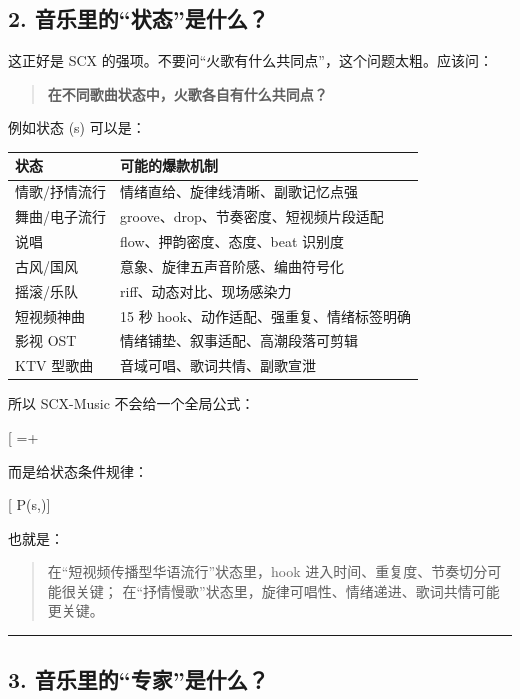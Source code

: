 \documentclass[
  12pt,
]{ctexart}
\begin{document}
\subsection{2.
音乐里的``状态''是什么？}\label{ux97f3ux4e50ux91ccux7684ux72b6ux6001ux662fux4ec0ux4e48}

这正好是 SCX 的强项。不要问``火歌有什么共同点''，这个问题太粗。应该问：

\begin{quote}
\textbf{在不同歌曲状态中，火歌各自有什么共同点？}
\end{quote}

例如状态 (s) 可以是：

\begin{longtable}[]{@{}ll@{}}
\toprule\noalign{}
状态 & 可能的爆款机制 \\
\midrule\noalign{}
\endhead
\bottomrule\noalign{}
\endlastfoot
情歌/抒情流行 & 情绪直给、旋律线清晰、副歌记忆点强 \\
舞曲/电子流行 & groove、drop、节奏密度、短视频片段适配 \\
说唱 & flow、押韵密度、态度、beat 识别度 \\
古风/国风 & 意象、旋律五声音阶感、编曲符号化 \\
摇滚/乐队 & riff、动态对比、现场感染力 \\
短视频神曲 & 15 秒 hook、动作适配、强重复、情绪标签明确 \\
影视 OST & 情绪铺垫、叙事适配、高潮段落可剪辑 \\
KTV 型歌曲 & 音域可唱、歌词共情、副歌宣泄 \\
\end{longtable}

所以 SCX-Music 不会给一个全局公式：

{[} =+\text{重复副歌}{]}

而是给状态条件规律：

{[} P(\mid s,){]}

也就是：

\begin{quote}
在``短视频传播型华语流行''状态里，hook
进入时间、重复度、节奏切分可能很关键；
在``抒情慢歌''状态里，旋律可唱性、情绪递进、歌词共情可能更关键。
\end{quote}

\begin{center}\rule{0.5\linewidth}{0.5pt}\end{center}

\subsection{3.
音乐里的``专家''是什么？}\label{ux97f3ux4e50ux91ccux7684ux4e13ux5bb6ux662fux4ec0ux4e48}
\end{document}
